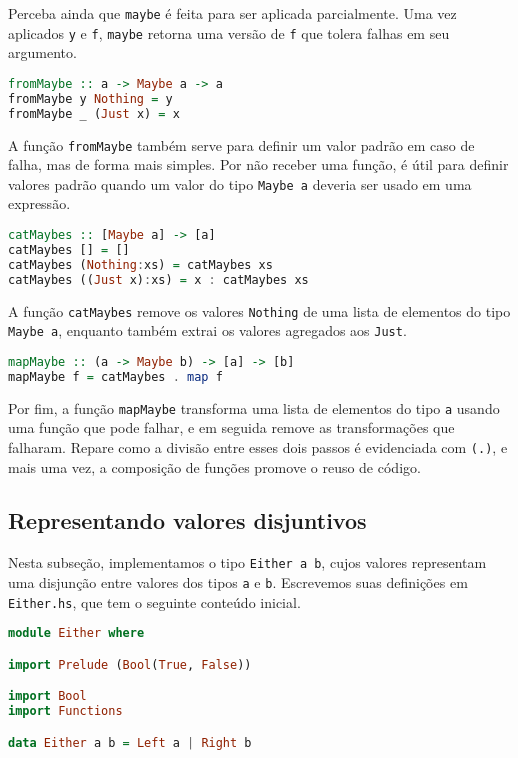 \documentclass[a4paper]{article}
\begin{document}
Perceba ainda que \texttt{maybe} é feita para ser aplicada parcialmente.
Uma vez aplicados \texttt{y} e \texttt{f}, \texttt{maybe} retorna uma versão de \texttt{f} que tolera falhas em seu argumento.

\begin{lstlisting}[language=haskell, frame=single]
fromMaybe :: a -> Maybe a -> a
fromMaybe y Nothing = y
fromMaybe _ (Just x) = x
\end{lstlisting}

A função \texttt{fromMaybe} também serve para definir um valor padrão em caso de falha, mas de forma mais simples.
Por não receber uma função, é útil para definir valores padrão quando um valor do tipo \texttt{Maybe a} deveria ser usado em uma expressão.

\begin{lstlisting}[language=haskell, frame=single]
catMaybes :: [Maybe a] -> [a]
catMaybes [] = []
catMaybes (Nothing:xs) = catMaybes xs
catMaybes ((Just x):xs) = x : catMaybes xs
\end{lstlisting}

A função \texttt{catMaybes} remove os valores \texttt{Nothing} de uma lista de elementos do tipo \texttt{Maybe a}, enquanto também extrai os valores agregados aos \texttt{Just}.

\begin{lstlisting}[language=haskell, frame=single]
mapMaybe :: (a -> Maybe b) -> [a] -> [b]
mapMaybe f = catMaybes . map f
\end{lstlisting}

Por fim, a função \texttt{mapMaybe} transforma uma lista de elementos do tipo \texttt{a} usando uma função que pode falhar, e em seguida remove as transformações que falharam.
Repare como a divisão entre esses dois passos é evidenciada com \texttt{(.)}, e mais uma vez, a composição de funções promove o reuso de código.

\subsection{Representando valores disjuntivos}

Nesta subseção, implementamos o tipo \texttt{Either a b}, cujos valores representam uma disjunção entre valores dos tipos \texttt{a} e \texttt{b}.
Escrevemos suas definições em \texttt{Either.hs}, que tem o seguinte conteúdo inicial.

\begin{lstlisting}[language=haskell, frame=single]
module Either where

import Prelude (Bool(True, False))

import Bool
import Functions

data Either a b = Left a | Right b
\end{lstlisting}
\end{document}
